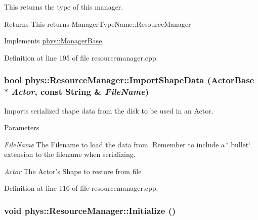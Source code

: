 This returns the type of this manager. 

\begin{DoxyReturn}{Returns}
This returns ManagerTypeName::ResourceManager 
\end{DoxyReturn}


Implements \hyperlink{classphys_1_1ManagerBase_aff400b6599db635e24796d8221e9a0e3}{phys::ManagerBase}.



Definition at line 195 of file resourcemanager.cpp.

\hypertarget{classphys_1_1ResourceManager_a6fb3434f5d7be221e7a474765c625ad9}{
\subsubsection[{ImportShapeData}]{\setlength{\rightskip}{0pt plus 5cm}bool phys::ResourceManager::ImportShapeData ({\bf ActorBase} $\ast$ {\em Actor}, \/  const {\bf String} \& {\em FileName})}}
\label{d1/d35/classphys_1_1ResourceManager_a6fb3434f5d7be221e7a474765c625ad9}


Imports serialized shape data from the disk to be used in an Actor. 


\begin{DoxyParams}{Parameters}
\item[{\em FileName}]The Filename to load the data from. Remember to include a \char`\"{}.bullet\char`\"{} extension to the filename when serializing. \item[{\em Actor}]The Actor's Shape to restore from file \end{DoxyParams}


Definition at line 116 of file resourcemanager.cpp.

\hypertarget{classphys_1_1ResourceManager_a9be3250f1f1153c9e079f82736eb00a8}{
\subsubsection[{Initialize}]{\setlength{\rightskip}{0pt plus 5cm}void phys::ResourceManager::Initialize ()}}
\label{d1/d35/classphys_1_1ResourceManager_a9be3250f1f1153c9e079f82736eb00a8}


